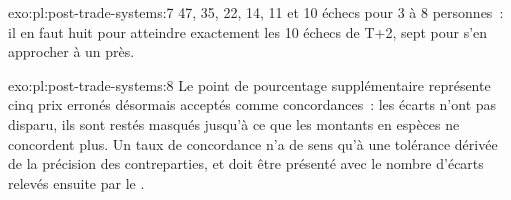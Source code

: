 \begin{solution}{exo:pl:post-trade-systems:7}
47, 35, 22, 14, 11 et 10 échecs pour 3 à 8 personnes~: il en faut huit pour atteindre exactement les 10 échecs de T+2, sept pour s'en approcher à un près.
\end{solution}

\begin{solution}{exo:pl:post-trade-systems:8}
Le point de pourcentage supplémentaire représente cinq prix erronés désormais acceptés comme concordances~: les écarts n'ont pas disparu, ils sont restés masqués jusqu'à ce que
les montants en espèces ne concordent plus. Un taux de concordance n'a de sens qu'à une tolérance dérivée de la précision des contreparties, et doit être présenté avec le nombre
d'écarts relevés ensuite par le .
\end{solution}

